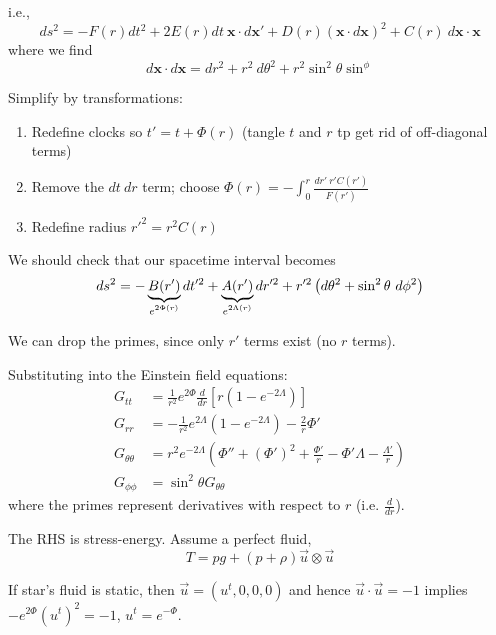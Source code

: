 \documentclass[a4paper]{article} %
\newcommand{\vect}[1]{\mathbf{#1}} %
\begin{document}
i.e.,
\begin{equation}
ds^2 = -F(r)dt^2 + 2E(r)dt~\vect{x}\cdot d\vect{x}'+D(r)(\vect{x}\cdot d\vect{x})^2
+C(r)~d\vect{x}\cdot \vect{x}
\end{equation}
where we find
\begin{equation}
d\vect{x}\cdot d\vect{x}= dr^2+r^2~d\theta^2 + r^2\sin^2\theta \sin^\phi
\end{equation}

Simplify by transformations:
\begin{enumerate}
\item Redefine clocks so $t'=t+\Phi(r)$ (tangle $t$ and $r$ tp get rid of off-diagonal terms)
\item Remove the $dt~dr$ term; choose $\Phi(r)=-\int^r_0 \frac{dr'~r'C(r')}{F(r')}$
\item Redefine radius $r'^2=r^2 C(r)$
\end{enumerate}

We should check that our spacetime interval becomes
\begin{equation}
ds^2=-\underbrace{B(r')}_{\mathclap{e^{2\Phi(r)}}}dt'^2+\underbrace{A(r')}_{\mathclap{e^{2\Lambda(r)}}}dr'^2
+r'^2\left(d\theta^2 + \sin^2\theta~d\phi^2\right)
\end{equation}

We can drop the primes, since only $r'$ terms exist (no $r$ terms).

Substituting into the Einstein field equations:
\begin{align}
G_{tt}&=\frac{1}{r^2}e^{2\Phi}\frac{d}{dr}\left[r\left(1-e^{-2\Lambda}\right)\right]\\
G_{rr}&=-\frac{1}{r^2}e^{2\Lambda}\left(1-e^{-2\Lambda}\right)-\frac{2}{r}\Phi'\\
G_{\theta\theta}&= r^2 e^{-2\Lambda}\left(\Phi''+(\Phi')^2+\frac{\Phi'}{r}-\Phi' \Lambda - \frac{\Lambda'}{r}\right)\\
G_{\phi\phi}&=\sin^2\theta G_{\theta\theta}
\end{align}
where the primes represent derivatives with respect to $r$ (i.e. $\frac{d}{dr}$).

The RHS is stress-energy. Assume a perfect fluid,
\begin{equation}
T=pg + (p+\rho)\vec{u}\otimes \vec{u}
\end{equation}

If star's fluid is static, then $\vec{u}=(u^t,0,0,0)$ and hence $\vec{u}\cdot\vec{u}=-1$ implies $-e^{2\Phi}(u^t)^2=-1$, $u^t = e^{-\Phi}$.
\end{document}
